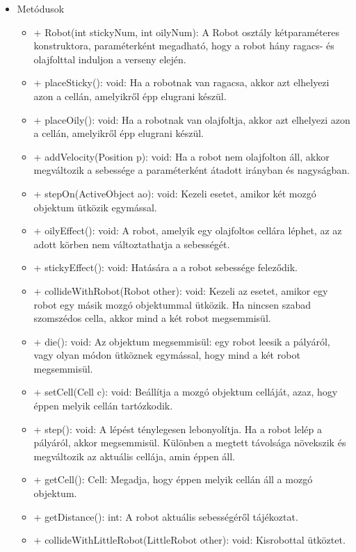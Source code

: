 \begin{itemize}
\begin{itemize}
	\end{itemize}
	\item Metódusok\newline
	\begin{itemize}
		\item + Robot(int stickyNum, int oilyNum): A Robot osztály kétparaméteres konstruktora, paraméterként megadható, hogy a robot hány ragacs- és olajfolttal induljon a verseny elején.
		\item + placeSticky(): void: Ha a robotnak van ragacsa, akkor azt elhelyezi azon a cellán, amelyikről épp elugrani készül.
		\item + placeOily(): void: Ha a robotnak van olajfoltja, akkor azt elhelyezi azon a cellán, amelyikről épp elugrani készül.
		\item + addVelocity(Position p): void: Ha a robot nem olajfolton áll, akkor megváltozik a sebessége a paraméterként átadott irányban és nagyságban.
		\item + stepOn(ActiveObject ao): void: Kezeli esetet, amikor két mozgó objektum ütközik egymással.
		\item + oilyEffect(): void: A robot, amelyik egy olajfoltos cellára léphet, az az adott körben nem változtathatja a sebességét. 
		\item + stickyEffect(): void: Hatására a a robot sebessége feleződik. 
		\item + collideWithRobot(Robot other): void: Kezeli az esetet, amikor egy robot egy másik mozgó objektummal ütközik. Ha nincsen szabad szomszédos cella, akkor mind a két robot megsemmisül. 
		\item + die(): void: Az objektum megsemmisül: egy robot leesik a pályáról, vagy olyan módon ütköznek egymással, hogy mind a két robot megsemmisül. 
		\item + setCell(Cell c): void: Beállítja a mozgó objektum celláját, azaz, hogy éppen melyik cellán tartózkodik.
		\item + step(): void: A lépést ténylegesen lebonyolítja. Ha a robot lelép a pályáról, akkor megsemmisül. Különben a megtett távolsága növekszik és megváltozik az aktuális cellája, amin éppen áll.
		\item + getCell(): Cell: Megadja, hogy éppen melyik cellán áll a mozgó objektum.
		\item + getDistance(): int: A robot aktuális sebességéről tájékoztat. 
		\item + collideWithLittleRobot(LittleRobot other): void: Kisrobottal ütköztet.
		
	\end{itemize}
\end{itemize}

